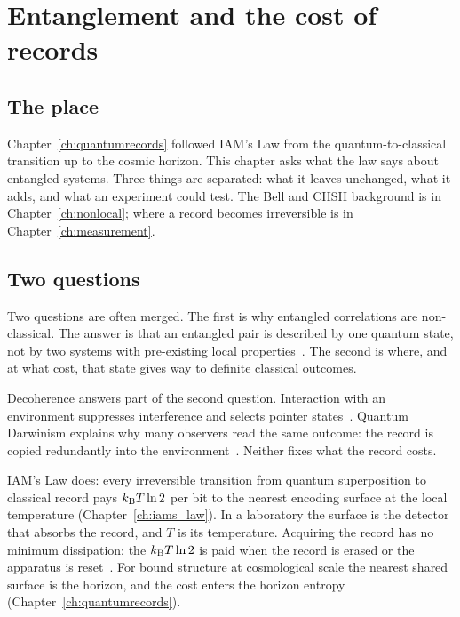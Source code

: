 \chapter{Entanglement and the cost of records}\label{ch:entanglement}

\section*{The place}
Chapter~\ref{ch:quantumrecords} followed IAM's Law from the quantum-to-classical transition up to the cosmic horizon. This chapter asks what the law
says about entangled systems. Three things are separated: what it leaves unchanged, what it adds, and what an experiment could test. The Bell and
CHSH background is in Chapter~\ref{ch:nonlocal}; where a record becomes irreversible is in Chapter~\ref{ch:measurement}.

\section{Two questions}\label{sec:ent:two}
Two questions are often merged. The first is why entangled correlations are non-classical. The answer is that an entangled pair is described by one
quantum state, not by two systems with pre-existing local properties~\cite{Bell1964}. The second is where, and at what cost, that state gives way to
definite classical outcomes.

Decoherence answers part of the second question. Interaction with an environment suppresses interference and selects pointer
states~\cite{Zurek1981,JoosZeh1985,Zurek2003}. Quantum Darwinism explains why many observers read the same outcome: the record is copied redundantly
into the environment~\cite{Zurek2009}. Neither fixes what the record costs.

IAM's Law does: every irreversible transition from quantum superposition to classical record pays $k_{\mathrm B} T\ln2$ per bit to the nearest encoding
surface at the local temperature (Chapter~\ref{ch:iams_law}). In a laboratory the surface is the detector that absorbs the record, and $T$ is its
temperature. Acquiring the record has no minimum dissipation; the $k_{\mathrm B} T\ln2$ is paid when the record is erased or the apparatus is
reset~\cite{Landauer1961,Bennett1982}. For bound structure at cosmological scale the nearest shared surface is the horizon, and the cost enters the
horizon entropy (Chapter~\ref{ch:quantumrecords}).

